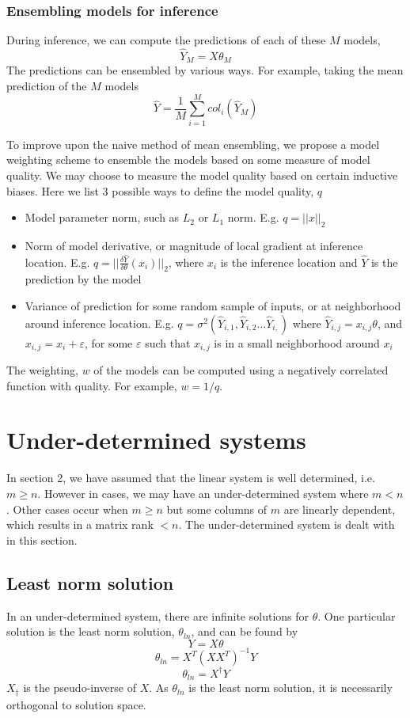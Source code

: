 \documentclass{article}
\begin{document}
\subsubsection{Ensembling models for inference}
During inference, we can compute the predictions of each of these $M$ models,
\[
\hat{Y}_M = X\theta_{M}
\]
The predictions can be ensembled by various ways. For example, taking the mean prediction of the $M$ models
\[
\hat{Y} = \frac{1}{M}\sum_{i=1}^M col_i(\hat{Y}_M)
\]

To improve upon the naive method of mean ensembling, we propose a model weighting scheme to ensemble the models based on some measure of model quality. We may choose to measure the model quality based on certain inductive biases. Here we list 3 possible ways to define the model quality, $q$

\begin{itemize}
  \item Model parameter norm, such as $L_2$ or $L_1$ norm. E.g. $q=||x||_2$
  \item Norm of model derivative, or magnitude of local gradient at inference location. E.g. $q=||\frac{\delta \hat{Y}}{\delta \theta}(x_i)||_2$, where $x_i$ is the inference location and $\hat{Y}$ is the prediction by the model
  \item Variance of prediction for some random sample of inputs, or at neighborhood around inference location. E.g. $q = \sigma^2(\hat{Y}_{i,1}, \hat{Y}_{i,2} ... \hat{Y}_{i,})$ where $\hat{Y}_{i,j} = x_{i,j}\theta$, and $x_{i,j} = x_i + \varepsilon$, for some $\varepsilon$ such that $x_{i,j}$ is in a small neighborhood around $x_i$
\end{itemize}

The weighting, $w$ of the models can be computed using a negatively correlated function with quality. For example, $w=1/q$.

\section{Under-determined systems}
In section 2, we have assumed that the linear system is well determined, i.e. $m \geq n$. However in cases, we may have an under-determined system where $m < n$. Other cases occur when $m \geq n$ but some columns of $m$ are linearly dependent, which results in a matrix rank $< n$. The under-determined system is dealt with in this section.

\subsection{Least norm solution}
In an under-determined system, there are infinite solutions for $\theta$. One particular solution is the least norm solution, $\theta_{ln}$, and can be found by
\[
Y = X\theta
\]
\[
\theta_{ln} = X^T (X X^T)^{-1} Y
\]
\[
\theta_{ln} = X^{\dag} Y
\]
$X_{\dag}$ is the pseudo-inverse of $X$. 
As $\theta_{ln}$ is the least norm solution, it is necessarily orthogonal to solution space.
\end{document}
